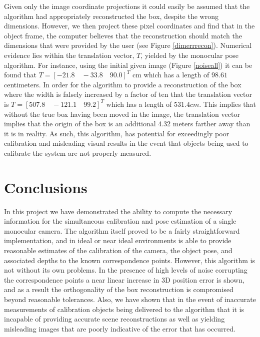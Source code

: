 \documentclass[12pt]{article}
\begin{document}
Given only the image coordinate projections it could easily be assumed that the algorithm had appropriately reconstructed the box, despite the wrong dimensions. However, we then project these pixel coordinates and find that in the object frame, the computer believes that the reconstruction should match the dimensions that were provided by the user (see Figure \ref{dimerrrecon}). Numerical evidence lies within the translation vector, $T$, yielded by the monocular pose algorithm. For instance, using the initial given image (Figure \ref{noiseall}) it can be found that $T = [-21.8 \quad -33.8 \quad 90.0]^T$ cm which has a length of $98.61$ centimeters. In order for the algorithm to provide a reconstruction of the box where the width is falsely increased by a factor of ten that the translation vector is $T=[507.8 \quad -121.1 \quad 99.2]^T$ which has a length of $531.4 cm$. This implies that without the true box having been moved in the image, the translation vector implies that the origin of the box is an additional 4.32 meters farther away than it is in reality. As such, this algorithm, has potential for exceedingly poor calibration and misleading visual results in the event that objects being used to calibrate the system are not properly measured. 

\section{Conclusions}
In this project we have demonstrated the ability to compute the necessary information for the simultaneous calibration and pose estimation of a single monocular camera. The algorithm itself proved to be a fairly straightforward implementation, and in ideal or near ideal environments is able to provide reasonable estimates of the calibration of the camera, the object pose, and associated depths to the known correspondence points. However, this algorithm is not without its own problems. In the presence of high levels of noise corrupting the correspondence points a near linear increase in 3D position error is shown, and as a result the orthogonality of the box reconstruction is compromised beyond reasonable tolerances. Also, we have shown that in the event of inaccurate measurements of calibration objects being delivered to the algorithm that it is incapable of providing accurate scene reconstructions as well as yielding misleading images that are poorly indicative of the error that has occurred. 


\appendix %
\end{document}
